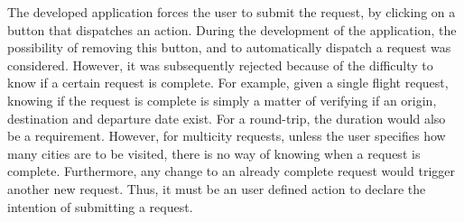 The developed application forces the user to submit the request, by clicking on a button that dispatches an action. During the development of the application, the possibility of removing this button, and to automatically dispatch a request was considered. However, it was subsequently rejected because of the difficulty to know if a certain request is complete. For example, given a single flight request, knowing if the request is complete is simply a matter of verifying if an origin, destination and departure date exist. For a round-trip, the duration would also be a requirement. However, for multicity requests, unless the user specifies how many cities are to be visited, there is no way of knowing when a request is complete. Furthermore, any change to an already complete request would trigger another new request. Thus, it must be an user defined action to declare the intention of submitting a request.






